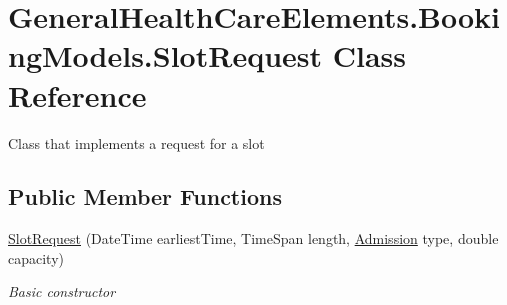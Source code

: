 \hypertarget{class_general_health_care_elements_1_1_booking_models_1_1_slot_request}{}\section{General\+Health\+Care\+Elements.\+Booking\+Models.\+Slot\+Request Class Reference}
\label{class_general_health_care_elements_1_1_booking_models_1_1_slot_request}


Class that implements a request for a slot  


\subsection*{Public Member Functions}
\begin{DoxyCompactItemize}
\item 
\hyperlink{class_general_health_care_elements_1_1_booking_models_1_1_slot_request_a4e6f03b0e71e549074f545282bd4ec29}{Slot\+Request} (Date\+Time earliest\+Time, Time\+Span length, \hyperlink{class_general_health_care_elements_1_1_treatment_admission_types_1_1_admission}{Admission} type, double capacity)
\begin{DoxyCompactList}\small\item\em Basic constructor \end{DoxyCompactList}\end{DoxyCompactItemize}
